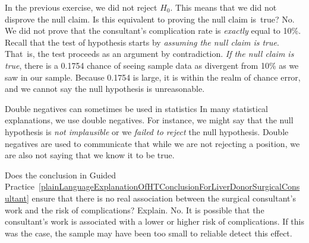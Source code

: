 \D{\newpage}

\begin{examplewrap}
\begin{nexample}{In the previous exercise, we did not reject $H_0$. This means that we did not disprove the null claim. Is this equivalent to proving the null claim is~true?}
No. We did not prove that the consultant's complication rate is \emph{exactly} equal to 10\%. Recall that the test of hypothesis starts by \emph{assuming the null claim is true}. That~is, the test proceeds as an argument by contradiction. \emph{If the null claim is true}, there is a 0.1754 chance of seeing sample data as divergent from 10\% as we saw in our sample. Because 0.1754 is large, it is within the realm of chance error, and we cannot say the null hypothesis is unreasonable.\footnotemark
\end{nexample}
\end{examplewrap}


\begin{onebox}{Double negatives can sometimes be used in statistics}
In many statistical explanations, we use double negatives. For instance, we might say that the null hypothesis is \emph{not implausible} or we \emph{failed to reject} the null hypothesis. Double negatives are used to communicate that while we are not rejecting a position, we are also not saying that we know it to be true.\end{onebox}

\begin{examplewrap}
\begin{nexample}{Does the conclusion in Guided Practice~\ref{plainLanguageExplanationOfHTConclusionForLiverDonorSurgicalConsultant} ensure that there is no real association between the surgical consultant's work and the risk of complications? Explain.}
No. It is possible that the consultant's work is associated with a lower or higher risk of complications.
If this was the case, the sample may have been too small
to reliable detect this effect.
\end{nexample}
\end{examplewrap}



